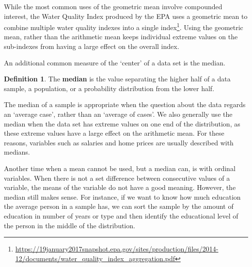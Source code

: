 \documentclass[
]{book}
\theoremstyle{definition}
\newtheorem{definition}{Definition}[chapter]
\theoremstyle{definition}
\theoremstyle{definition}
\theoremstyle{definition}
\theoremstyle{remark}
\begin{document}
While the most common uses of the geometric mean involve compounded interest, the Water Quality Index produced by the EPA uses a geometric mean to combine multiple water quality indexes into a single index\footnote{\url{https://19january2017snapshot.epa.gov/sites/production/files/2014-12/documents/water_quality_index_aggregation.pdf}}. Using the geometric mean, rather than the arithmetic mean keeps individual extreme values on the sub-indexes from having a large effect on the overall index.

An additional common measure of the `center' of a data set is the median.

\begin{definition}
The \textbf{median} is the value separating the higher half of a data sample, a population, or a probability distribution from the lower half.
\end{definition}

The median of a sample is appropriate when the question about the data regards an `average case', rather than an `average of cases'. We also generally use the median when the data set has extreme values on one end of the distribution, as these extreme values have a large effect on the arithmetic mean. For these reasons, variables such as salaries and home prices are usually described with medians.

Another time when a mean cannot be used, but a median can, is with ordinal variables. When there is not a set difference between consecutive values of a variable, the means of the variable do not have a good meaning. However, the median still makes sense. For instance, if we want to know how much education the average person in a sample has, we can sort the sample by the amount of education in number of years or type and then identify the educational level of the person in the middle of the distribution.
\end{document}
